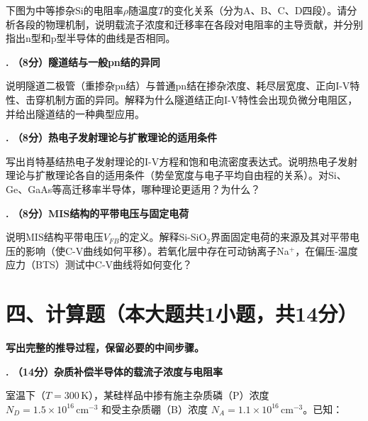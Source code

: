 \documentclass[12pt,a4paper]{ctexart}
\newcounter{qcounter}
\newcommand{\选择题}{\stepcounter{qcounter}\arabic{qcounter}.\,}
\newcommand{\填空题}{\stepcounter{qcounter}\arabic{qcounter}.\,}
\begin{document}
下图为中等掺杂Si的电阻率$\rho$随温度$T$的变化关系（分为A、B、C、D四段）。请分析各段的物理机制，说明载流子浓度和迁移率在各段对电阻率的主导贡献，并分别指出n型和p型半导体的曲线是否相同。

\vspace{11cm}

\noindent\textbf{. （8分）隧道结与一般pn结的异同}

说明隧道二极管（重掺杂pn结）与普通pn结在掺杂浓度、耗尽层宽度、正向I-V特性、击穿机制方面的异同。解释为什么隧道结正向I-V特性会出现负微分电阻区，并给出隧道结的一种典型应用。

\vspace{11cm}

\newpage

\noindent\textbf{. （8分）热电子发射理论与扩散理论的适用条件}

写出肖特基结热电子发射理论的I-V方程和饱和电流密度表达式。说明热电子发射理论与扩散理论各自的适用条件（势垒宽度与电子平均自由程的关系）。对Si、Ge、GaAs等高迁移率半导体，哪种理论更适用？为什么？

\vspace{11cm}

\noindent\textbf{. （8分）MIS结构的平带电压与固定电荷}

说明MIS结构平带电压$V_{FB}$的定义。解释Si-SiO$_2$界面固定电荷的来源及其对平带电压的影响（使C-V曲线如何平移）。若氧化层中存在可动钠离子Na$^+$，在偏压-温度应力（BTS）测试中C-V曲线将如何变化？

\newpage

\section*{四、计算题（本大题共1小题，共14分）}

\textbf{写出完整的推导过程，保留必要的中间步骤。}

\vspace{4pt}

\setcounter{qcounter}{0}

\noindent\textbf{. （14分）杂质补偿半导体的载流子浓度与电阻率}

室温下（$T = 300\,\text{K}$），某硅样品中掺有施主杂质磷（P）浓度 $N_D = 1.5 \times 10^{16}\,\text{cm}^{-3}$ 和受主杂质硼（B）浓度 $N_A = 1.1 \times 10^{16}\,\text{cm}^{-3}$。已知：
\end{document}
